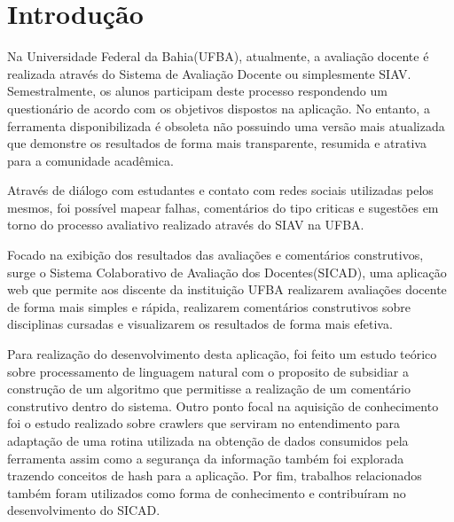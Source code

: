 \documentclass[12pt, a4paper]{report}
\begin{document}
\begin{acronym}
\end{acronym}



\chapter{Introdução}
\label{chap:introducao}

Na Universidade Federal da Bahia(\ac{UFBA}), atualmente, a avaliação docente é realizada através do Sistema de Avaliação Docente ou simplesmente SIAV. Semestralmente, os alunos participam deste processo respondendo um questionário de acordo com os objetivos dispostos na aplicação. No entanto, a  ferramenta disponibilizada é obsoleta não possuindo uma versão mais atualizada que demonstre os resultados de forma mais transparente, resumida e atrativa para a comunidade acadêmica.

Através de diálogo com estudantes e contato com redes sociais utilizadas pelos mesmos, foi possível mapear falhas, comentários do tipo criticas e sugestões em torno do processo  avaliativo realizado através do SIAV na \ac{UFBA}.

Focado na exibição dos resultados das avaliações e comentários construtivos, surge o Sistema Colaborativo de Avaliação dos Docentes(\ac{SICAD}), uma aplicação web que permite aos discente da instituição UFBA realizarem avaliações docente de forma mais simples e rápida, realizarem comentários construtivos sobre disciplinas cursadas e visualizarem os resultados de forma mais efetiva.

Para realização do desenvolvimento desta aplicação, foi feito um estudo teórico sobre processamento de linguagem natural com o proposito de subsidiar a construção de um algoritmo que permitisse a realização de um comentário construtivo dentro do sistema. Outro ponto focal na aquisição de conhecimento foi o estudo realizado sobre crawlers que serviram no entendimento para adaptação de uma rotina utilizada na obtenção de dados consumidos pela ferramenta assim como a segurança da informação também foi explorada trazendo conceitos de hash para a aplicação. Por fim, trabalhos relacionados também foram utilizados como forma de conhecimento e contribuíram no desenvolvimento do \ac{SICAD}.
\end{document}
